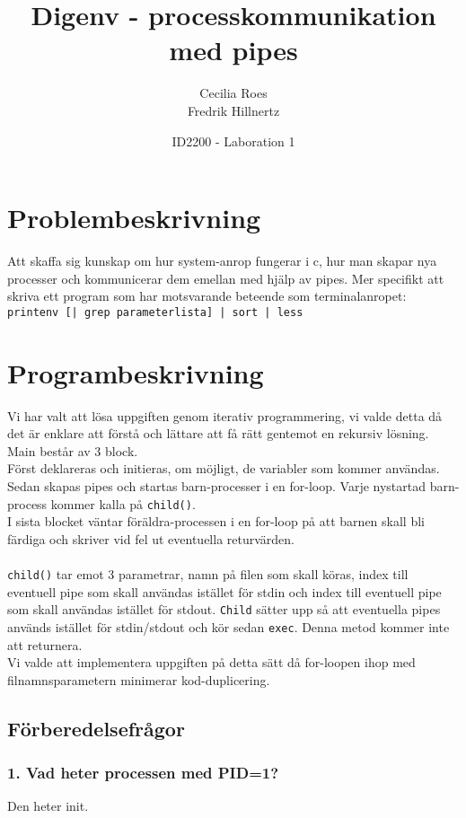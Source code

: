 \documentclass[a4paper]{article}
\title{Digenv - processkommunikation med pipes}
\date{ID2200 - Laboration 1}
\author{Cecilia Roes \\ Fredrik Hillnertz}
\begin{document}
\maketitle

\section*{Problembeskrivning}
Att skaffa sig kunskap om hur system-anrop fungerar i c, hur man skapar nya processer och kommunicerar dem emellan med hjälp av pipes.
Mer specifikt att skriva ett program som har motsvarande beteende som terminalanropet: \texttt{printenv [| grep parameterlista] | sort | less}

\section*{Programbeskrivning}
Vi har valt att lösa uppgiften genom iterativ programmering, vi valde detta då det är enklare att förstå och lättare att få rätt gentemot en rekursiv lösning.
Main består av 3 block.
\\
Först deklareras och initieras, om möjligt, de variabler som kommer användas.
\\
Sedan skapas pipes och startas barn-processer i en for-loop. Varje nystartad barn-process kommer kalla på \texttt{child()}.
\\
I sista blocket väntar föräldra-processen i en for-loop på att barnen skall bli färdiga och skriver vid fel ut eventuella returvärden.
\\
\\
\texttt{child()} tar emot 3 parametrar, namn på filen som skall köras, index till eventuell pipe som skall användas istället för stdin och index till eventuell pipe som skall användas istället för stdout. \texttt{Child} sätter upp så att eventuella pipes används istället för stdin/stdout och kör sedan \texttt{exec}. Denna metod kommer inte att returnera.
\\
Vi valde att implementera uppgiften på detta sätt då for-loopen ihop med filnamnsparametern minimerar kod-duplicering.

\subsection*{Förberedelsefrågor}
\subsubsection*{1. Vad heter processen med PID=1?}
Den heter init.
\end{document}

